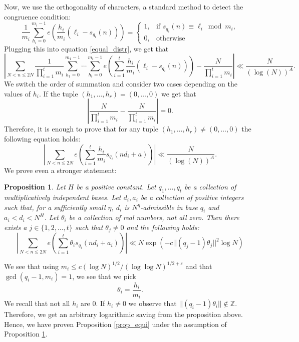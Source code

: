 \documentclass[12pt]{amsart}
\renewcommand{\leq}{\leqslant}
\newtheorem{proposition}[theorem]{Proposition}
\theoremstyle{definition}
\numberwithin{equation}{section}
\newcommand\ZZ{\mathbb{Z}}
\numberwithin{equation}{section}
\begin{document}
Now, we use the orthogonality of characters, a standard method to detect the congruence condition:
\[
\frac{1}{m_i}\sum_{h_i=0}^{m_i-1}e\left(\frac{h_i}{m_i}(\ell_i-s_{q_i}(n))\right)=\begin{cases}
	1, & \text{if } s_{q_i}(n)\equiv \ell_i \bmod m_i,\\
	0, & \text{otherwise}
\end{cases}
\]
Plugging this into equation \eqref{equal_distr}, we get that
\begin{equation}
	\left|\sum_{N<n\leq 2N}\frac{1}{\prod_{i=1}^{t}m_i}\sum_{h_1=0}^{m_1-1}\cdots \sum_{h_t=0}^{m_t-1}e\left(
	\sum_{i=1}^{t}\frac{h_i}{m_i}(\ell_i-s_{q_i}(n))\right)-\frac{N}{\prod_{i=1}^{t}m_i} \right| \ll \frac{N}{(\log(N))^A}.
\end{equation}
We switch the order of summation and consider two cases depending on the values of $h_i$. If the tuple $(h_1,\dots, h_r)= (0,\dots,0)$ we get that
\begin{equation}
	\left|\frac{N}{\prod_{i=1}^{t}m_i} - \frac{N}{\prod_{i=1}^{t}m_i}\right| = 0.
\end{equation}
Therefore, it is enough to prove that for any tuple $(h_1,\dots, h_r)\neq(0,\dots,0)$ the following equation holds:
\begin{equation}
	\left|\sum_{N<n\leq 2N}e\left(\sum_{i=1}^{t}\frac{h_i}{m_i}s_{q_i}(nd_i+a)\right)\right| \ll \frac{N}{(\log(N))^A}.
\end{equation}
We prove even a stronger statement:
\begin{proposition}\label{prop_theta_equi}
	Let $H$ be a positive constant. Let $q_1, \dots, q_t$ be a collection of multiplicatively independent bases. Let $d_i, a_i$ be a collection of positive integers such that, for a sufficiently small $\eta$, $d_i$ is $N^{\eta}$-admissible in base $q_i$ and $a_i<d_i<N^H$. Let $\theta_i$ be a collection of real numbers, not all zero. Then there exists a $j\in \{1,2,\dots, t\}$ such that $\theta_j\neq 0$ and the following holds:
	\begin{equation}
		\left|\sum_{N<n\leq 2N}e\left(\sum_{i=1}^{t}\theta_is_{q_i}(nd_i+a_i)\right)\right| \ll N \exp\left(-c||(q_j-1)\theta_j||^2\log N\right)
	\end{equation}
\end{proposition}
We see that using $m_i\leq c (\log N)^{1/2}/(\log\log N)^{1/2+\varepsilon}$ and that $\gcd(q_i-1,m_i)=1$, we see that we pick 
\[
	\theta_i = \frac{h_i}{m_i}.
\]
We recall that not all $h_i$ are $0$. If $h_i\neq 0$ we observe that $||(q_i-1)\theta_i||\notin \ZZ$. Therefore, we get an arbitrary logarithmic saving from the proposition above. Hence, we have proven Proposition \ref{prop_equi} under the assumption of Proposition \ref{prop_theta_equi}.
\end{document}
